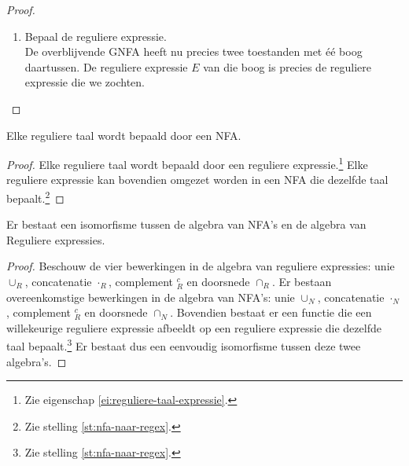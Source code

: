 \documentclass[main.tex]{subfiles}
\begin{document}
\begin{st}
\begin{proof}
\begin{enumerate}
\begin{itemize}
      \item
        Als $s$ aanvaard wordt door $GNFA_{na}$ dan bevat het acceptatiepad alleen maar toestanden verschillend van $X$. Op een boog van $A$ naar $B$ staat de reguliere expressie $E_{4}|E_{1}E_{2}^{*}E_{3}$. Die reguliere expressie gebruiken kost een stukje string dat voldoet aan $E_{4}$ of $E_{1}E_{2}^{*}E_{3}$. In $GNFA_{voor}$ komt dat overeen met ofwel boog $AB$ volgen, ofwel $AX$, gevolgd door $n$ keer $XX$ en $XB$. Dit houdt in dat de string ofwel het pad langs $X$ nodig had, ofwel het pad zonder $X$, langs $A$ en $B$. In beide gevallen aanvaardt $GNFA_{voor}$ ook $s$.
      \end{itemize}
    \item Bepaal de reguliere expressie.\\
      De overblijvende GNFA heeft nu precies twee toestanden met \'e\'e boog daartussen.
      De reguliere expressie $E$ van die boog is precies de reguliere expressie die we zochten.
    \end{enumerate}
  \end{proof}
\end{st}

\begin{gev}
  \label{gev:reguliere-taal-NFA}
  Elke reguliere taal wordt bepaald door een NFA.
  
  \begin{proof}
    Elke reguliere taal wordt bepaald door een reguliere expressie.\footnote{Zie eigenschap \ref{ei:reguliere-taal-expressie}.}
    Elke reguliere expressie kan bovendien omgezet worden in een NFA die dezelfde taal bepaalt.\footnote{Zie stelling \ref{st:nfa-naar-regex}.}
  \end{proof}
\end{gev}

\begin{ei}
  Er bestaat een isomorfisme tussen de algebra van NFA's en de algebra van Reguliere expressies.

  \begin{proof}
    Beschouw de vier bewerkingen in de algebra van reguliere expressies: unie $\cup_{R}$, concatenatie $\cdot_{R}$, complement $^{c}_{R}$ en doorsnede $\cap_{R}$.
    Er bestaan overeenkomstige bewerkingen in de algebra van NFA's: unie $\cup_{N}$, concatenatie $\cdot_{N}$, complement $^{c}_{R}$ en doorsnede $\cap_{N}$.
    Bovendien bestaat er een functie die een willekeurige reguliere expressie afbeeldt op een reguliere expressie die dezelfde taal bepaalt.\footnote{Zie stelling \ref{st:nfa-naar-regex}.}
    Er bestaat dus een eenvoudig isomorfisme tussen deze twee algebra's.
  \end{proof}
\end{ei}
\end{document}
